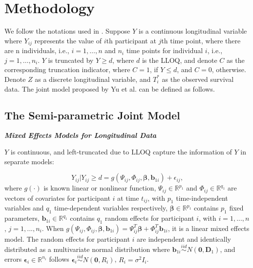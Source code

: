 \section{Methodology}
\label{sec:method}

We follow the notations used in \cite{yu2018joint}. Suppose $Y$ is a continuous longitudinal variable where $Y_{ij}$ represents the value of $i$th participant at $j$th time point, where there are n individuals, i.e., $i=1,\dots,n$ and $n_i$ time points for individual $i$, i.e., $j=1,\dots,n_i$. $Y$ is truncated by $Y\geq d$, where $d$ is the LLOQ, and denote $C$ as the corresponding truncation indicator, where $C=1$, if $Y\leq d$, and $C=0$, otherwise. Denote $Z$ as a discrete longitudinal variable, and $T_i^{\ast}$ as the observed survival data. The joint model proposed by Yu et al. \cite{yu2018joint} can be defined as follows.



\subsection{The Semi-parametric Joint Model}
\label{sec:2.1}

\vspace{2mm}
\noindent \textbf{\textit{Mixed Effects Models for Longitudinal Data}}
\vspace{2mm}

$Y$ is continuous, and left-truncated due to LLOQ
capture the information of $Y$ in separate models:

\begin{equation}
    Y_{ij}|Y_{ij}\geq d = g({\Psi}_{ij}, {\Phi}_{ij}, \boldsymbol{\beta}, \boldsymbol{b}_{1i}) + \epsilon_{ij},
\end{equation}
where $g(\cdot)$ is known linear or nonlinear function, ${\Psi}_{ij}\in \mathbb{R}^{p_1}$ and ${\Phi}_{ij}\in \mathbb{R}^{q_1}$ are vectors of covariates for participant $i$ at time $t_{ij}$, with $p_1$ time-independent variables and $q_1$ time-dependent variables respectively, $\boldsymbol{\beta}\in \mathbb{R}^{p_1}$ contains $p_1$ fixed parameters, $\boldsymbol{b}_{1i}\in \mathbb{R}^{q_1}$ contains $q_1$ random effects for participant $i$, with $i=1,...,n$, $j=1,...,n_i$. When $g({\Psi}_{ij}, {\Phi}_{ij}, \boldsymbol{\beta}, \boldsymbol{b}_{1i}) = {\Psi}_{ij}^T \boldsymbol{\beta} + {\Phi}_{ij}^T \boldsymbol{b}_{1i}$, it is a linear mixed effects model. The random effects for participant $i$ are independent and identically distributed as a multivariate normal distribution where $\boldsymbol{b}_{1i}\stackrel{iid}{\sim} N(\boldsymbol{0}, \boldsymbol{D}_1)$, and errors $\boldsymbol{\epsilon}_i\in \mathbb{R}^{n_i}$ follows $\boldsymbol{\epsilon}_{i}\stackrel{iid}{\sim} N(\boldsymbol{0}, {R}_i)$, ${R}_i=\sigma^2 {I}_i$.


